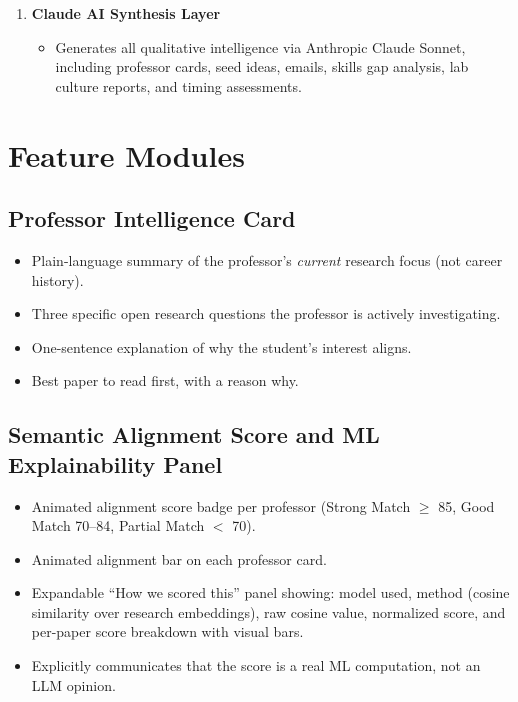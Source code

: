 \documentclass{article}
\begin{document}
\begin{enumerate}[label=\textbf{\arabic*.}]
  \item \textbf{Claude AI Synthesis Layer}
    \begin{itemize}
      \item Generates all qualitative intelligence via Anthropic Claude Sonnet,
            including professor cards, seed ideas, emails, skills gap analysis,
            lab culture reports, and timing assessments.
    \end{itemize}

\end{enumerate}

\section{Feature Modules}

\subsection{Professor Intelligence Card}
\begin{itemize}
  \item Plain-language summary of the professor's \emph{current} research focus
        (not career history).
  \item Three specific open research questions the professor is actively investigating.
  \item One-sentence explanation of why the student's interest aligns.
  \item Best paper to read first, with a reason why.
\end{itemize}

\subsection{Semantic Alignment Score and ML Explainability Panel}
\begin{itemize}
  \item Animated alignment score badge per professor (Strong Match $\geq$ 85,
        Good Match 70--84, Partial Match $<$ 70).
  \item Animated alignment bar on each professor card.
  \item Expandable ``How we scored this'' panel showing:
        model used, method (cosine similarity over research embeddings),
        raw cosine value, normalized score, and per-paper score breakdown
        with visual bars.
  \item Explicitly communicates that the score is a real ML computation,
        not an LLM opinion.
\end{itemize}
\end{document}
